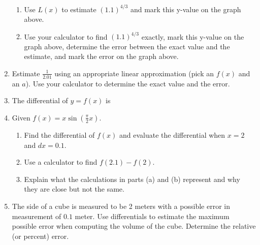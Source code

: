 \documentclass[11pt,fleqn]{article}
\begin{document}
\begin{enumerate}
\begin{enumerate}
	\item Use $L(x)$ to estimate $(1.1)^{4/3}$ and mark this y-value on the graph above.
	\vfill
	\item Use your calculator to find $(1.1)^{4/3}$ exactly, mark this y-value on the graph above, determine the error between the exact value and the estimate, and mark the error on the graph above.
	\vfill
	\end{enumerate}
\item Estimate $\frac{1}{2.01}$ using an appropriate linear approximation (pick an $f(x)$ and an $a$). Use your calculator to determine the exact value and the error.\vfill
\newpage
\item The differential of $y=f(x)$ is 
\vspace{.5in}
\item Given $f(x)=x \sin( \frac{\pi}{2} x)$. 
	\begin{enumerate}
	\item Find the differential of $f(x)$ and evaluate the differential when $x=2$ and $dx=0.1.$
	\vfill
	\item Use a calculator to find $f(2.1)-f(2).$
	\vfill
	\item Explain what the calculations in parts (a) and (b) represent and why they are close but not the same.
	\vfill
	\end{enumerate}
\item The side of a cube is measured to be 2 meters with a possible error in measurement of $0.1$ meter. Use differentials to estimate the maximum possible error when computing the volume of the cube. Determine the relative (or percent) error.
\vfill
\end{enumerate}
\end{document}
